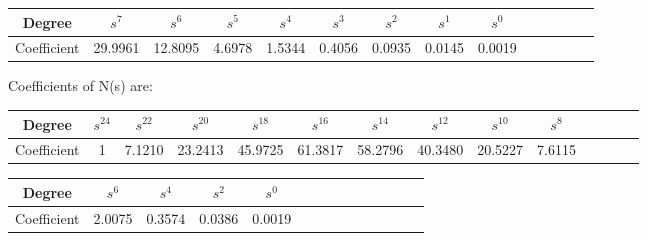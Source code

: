 \documentclass{article}
\begin{document}
\begin{table}[H]
		\begin{center}
		\begin{tabular}{|c|c|c|c|c|c|c|c|c|c|c|c|c|c|}
			\hline
			Degree &  $s^7$ & $s^6$  & $s^5$ & $s^4$ & $s^3$ & $s^2$ & $s^1$ & $s^0$ \\
			
			\hline
                Coefficient  & 29.9961 & 12.8095 & 4.6978 & 1.5344 & 0.4056 & 0.0935 & 0.0145 & 0.0019 \\
                \hline
            
		\end{tabular}
		\end{center}
\end{table}

Coefficients of N(s) are:

\begin{table}[H]
		\begin{center}
		\begin{tabular}{|c|c|c|c|c|c|c|c|c|c|c|c|c|c|}
			\hline
			Degree & $s^{24}$ & $s^{22}$ & $s^{20}$  & $s^{18}$ & $s^{16}$ & $s^{14}$ & $s^{12}$ & $s^{10}$ & $s^{8}$\\
			
			\hline
                Coefficient & 1 & 7.1210 & 23.2413 & 45.9725 & 61.3817 & 58.2796 & 40.3480 & 20.5227 & 7.6115 \\
                \hline
            
		\end{tabular}
		\end{center}
\end{table}

\begin{table}[H]
		\begin{center}
		\begin{tabular}{|c|c|c|c|c|c|c|c|c|c|c|c|c|c|}
			\hline
			Degree & $s^6$ & $s^4$ & $s^2$  & $s^0$ \\
			
			\hline
                Coefficient & 2.0075 & 0.3574 & 0.0386 & 0.0019 \\
                \hline
            
		\end{tabular}
		\end{center}
\end{table}
\end{document}
